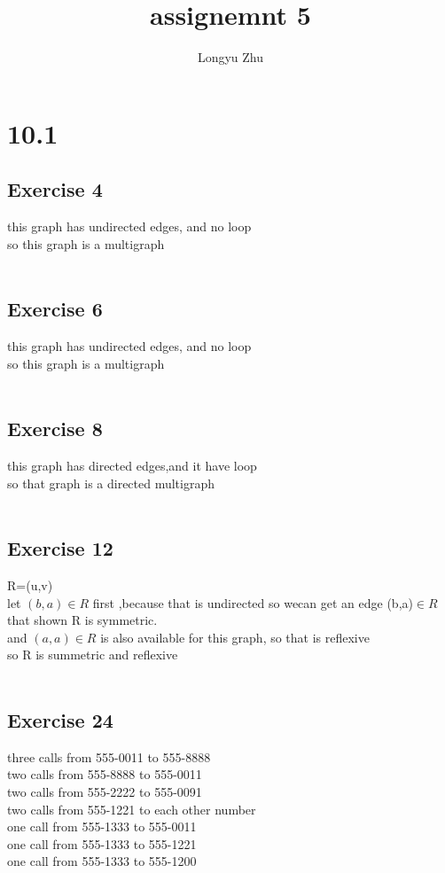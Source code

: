 \documentclass[12pt]{article}
\title{assignemnt 5}
\author{Longyu Zhu}
\begin{document}
\section*{10.1}
\subsection*{Exercise 4}
this graph has undirected edges, and no loop\\
so this graph is a multigraph\\
\\
\subsection*{Exercise 6}
this graph has undirected edges, and no loop\\
so this graph is a multigraph\\
\\
\subsection*{Exercise 8}
this graph has directed edges,and it have loop\\
so that graph is a directed multigraph\\
\\
\subsection*{Exercise 12}
R={(u,v)} \\
let $(b,a)\in R $ first ,because that is undirected so wecan get an edge (b,a)$\in R$ that shown R is symmetric.\\
and $(a,a)\in R$ is also available for this graph, so that is reflexive\\
so R is summetric and reflexive\\
\\
\subsection*{Exercise 24}
three calls from 555-0011 to 555-8888\\
two calls from 555-8888 to 555-0011\\
two calls from 555-2222 to 555-0091\\
two calls from 555-1221 to each other number\\
one call from 555-1333 to 555-0011\\
one call from 555-1333 to 555-1221\\
one call from 555-1333 to 555-1200\\
\end{document}

